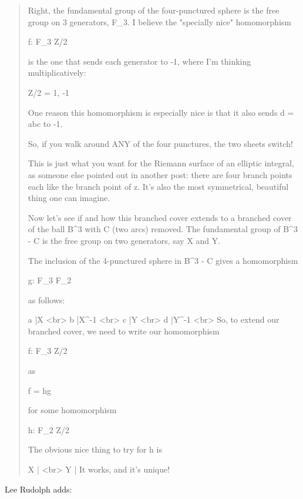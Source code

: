 \begin{quote}
  Right, the fundamental group of the four-punctured sphere is
  the free group on 3 generators, F_{3}.  I believe the "specially nice" 
  homomorphism 

  f: F_{3} \to  Z/2

  is the one that sends each generator to -1, where I'm thinking 
  multiplicatively:

  Z/2 = {1, -1}

  One reason this homomorphism is especially nice is that it also sends 
  d = abc to -1.  

  So, if you walk around ANY of the four punctures, the two sheets switch!

  This is just what you want for the Riemann surface of an elliptic 
  integral, as someone else pointed out in another post: there are 
  four branch points each like the branch point of \sqrt z.  It's 
  also the most symmetrical, beautiful thing one can imagine.

  Now let's see if and how this branched cover extends to a branched
  cover of the ball B^{3} with C (two arcs) removed.  The fundamental group
  of B^{3} - C is the free group on two generators, say X and Y.  

  The inclusion of the 4-punctured sphere in B^{3} - C gives a homomorphism

  g: F_{3} \to  F_{2}

  as follows:

  a |\to  X  <br>
  b |\to  X^{-1}  <br>
  c |\to  Y      <br>
  d |\to  Y^{-1}   <br>
  So, to extend our branched cover, we need to write our homomorphism

  f: F_{3} \to  Z/2

  as

  f = hg

  for some homomorphism

  h: F_{2} \to  Z/2

  The obvious nice thing to try for h is

  X | <br>
  Y |
  It works, and it's unique!
\end{quote}


Lee Rudolph adds:

